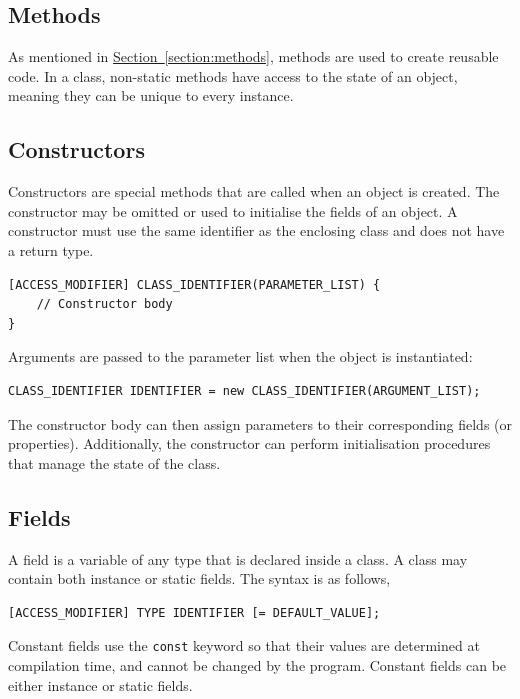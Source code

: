 \documentclass{article}
\begin{document}
\subsection{Methods}
As mentioned in \hyperref[section:methods]{Section~\ref{section:methods}}, methods are used to
create reusable code. In a class, non-static methods have access to the
state of an object, meaning they can be unique to every instance.
\subsection{Constructors}
Constructors are special methods that are called when an object is created.
The constructor may be omitted or used to initialise the fields of an object.
A constructor must use the same identifier as the enclosing class and does not have a return type.
\begin{lstlisting}[numbers=none]
[ACCESS_MODIFIER] CLASS_IDENTIFIER(PARAMETER_LIST) {
    // Constructor body
}
\end{lstlisting}
Arguments are passed to the parameter list when the object is instantiated:
\begin{lstlisting}[numbers=none]
CLASS_IDENTIFIER IDENTIFIER = new CLASS_IDENTIFIER(ARGUMENT_LIST); 
\end{lstlisting}
The constructor body can then assign parameters to their corresponding fields (or properties).
Additionally, the constructor can perform initialisation procedures that manage the state of the class.
\subsection{Fields}
A field is a variable of any type that is declared inside a class. A class may contain both instance
or static fields. The syntax is as follows,
\begin{lstlisting}[numbers=none]
[ACCESS_MODIFIER] TYPE IDENTIFIER [= DEFAULT_VALUE];
\end{lstlisting}
Constant fields use the \lstinline{const} keyword so that their values are determined at compilation time, and cannot be changed
by the program. Constant fields can be either instance or static fields.
\end{document}
